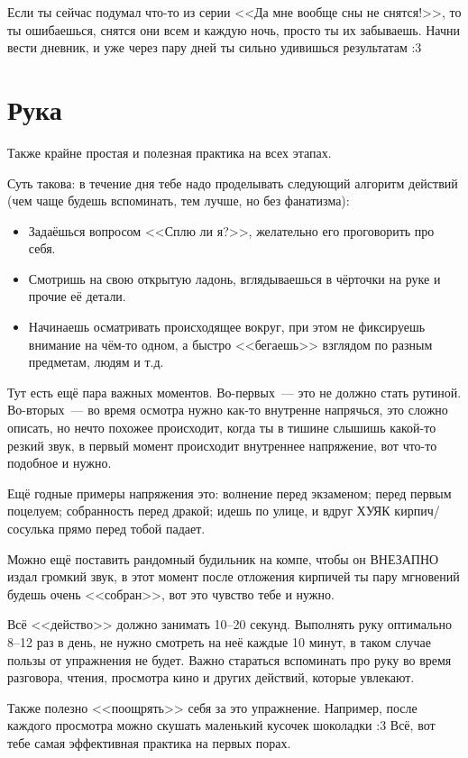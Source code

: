\documentclass[a5paper,12pt,twoside]{memoir}
\begin{document}
Если ты сейчас подумал что-то из серии <<Да мне вообще сны не снятся!>>, то ты ошибаешься, снятся они всем и каждую ночь, просто ты их забываешь. Начни вести дневник, и уже через пару дней ты сильно удивишься результатам :3 

\section{Рука}

Также крайне простая и полезная практика на всех этапах.

Суть такова: в течение дня тебе надо проделывать следующий алгоритм действий (чем чаще будешь вспоминать, тем лучше, но без фанатизма):
\begin{itemize}
\item Задаёшься вопросом <<Сплю ли я?>>, желательно его проговорить про себя.
\item Смотришь на свою открытую ладонь, вглядываешься в чёрточки на руке и прочие её детали.
\item Начинаешь осматривать происходящее вокруг, при этом не фиксируешь внимание на чём-то одном, а быстро <<бегаешь>> взглядом по разным предметам, людям и т.д.
\end{itemize}

Тут есть ещё пара важных моментов. Во-первых~--- это не должно стать рутиной. Во-вторых~--- во время осмотра нужно как-то внутренне напрячься, это сложно описать, но нечто похожее происходит, когда ты в тишине слышишь какой-то резкий звук, в первый момент происходит внутреннее напряжение, вот что-то подобное и нужно.

Ещё годные примеры напряжения это: волнение перед экзаменом; перед первым поцелуем; собранность перед дракой; идешь по улице, и вдруг ХУЯК кирпич/сосулька прямо перед тобой падает.
 
Можно ещё поставить рандомный будильник на компе, чтобы он ВНЕЗАПНО издал громкий звук, в этот момент после отложения кирпичей ты пару мгновений будешь очень <<собран>>, вот это чувство тебе и нужно.

Всё <<действо>> должно занимать 10--20 секунд. Выполнять руку оптимально 8--12 раз в день, не нужно смотреть на неё каждые 10 минут, в таком случае пользы от упражнения не будет. Важно стараться вспоминать про руку во время разговора, чтения, просмотра кино и других действий, которые увлекают. 

Также полезно <<поощрять>> себя за это упражнение. Например, после каждого просмотра можно скушать маленький кусочек шоколадки :3
Всё, вот тебе самая эффективная практика на первых порах.
\end{document}
